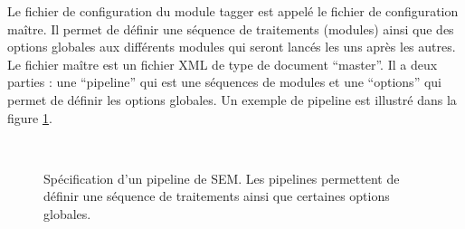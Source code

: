 \documentclass[manual-fr.tex]{subfiles}
\begin{document}
Le fichier de configuration du module tagger est appelé le fichier de configuration maître. Il permet de définir une séquence de traitements
(modules) ainsi que des options globales aux différents modules qui seront lancés les uns après les autres.\\

Le fichier maître est un fichier XML de type de document ``master''. Il a deux parties : une ``pipeline'' qui est une séquences de modules et
une ``options'' qui permet de définir les options globales. Un exemple de pipeline est illustré dans la figure \ref{fig:sem-pipeline}.\\

\begin{figure}[ht!]
\footnotesize
\begin{xml}
\\
\end{xml}
\caption{Spécification d'un pipeline de SEM. Les pipelines permettent de définir une séquence de traitements ainsi que certaines options globales.}
\label{fig:sem-pipeline}
\end{figure}
\end{document}

